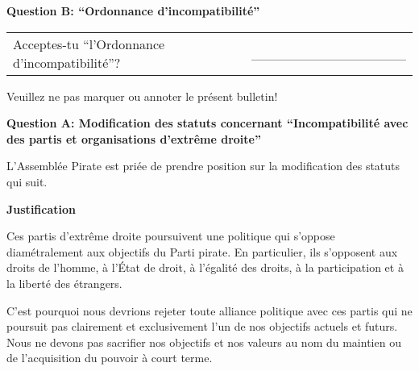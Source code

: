 \documentclass[11pt, a4paper]{scrartcl}
\begin{document}
{\begin{minipage}[t][12.5cm][t]{17.7cm}
\vspace{0.5cm}

\textbf{Question B: \enquote{Ordonnance d'incompatibilité}}

\vspace{0.5cm}

\begin{tabular}{ b{13.5cm} b{3cm} }
Acceptes-tu \enquote{l'Ordonnance d'incompatibilité}?
& \_\_\_\_\_\_\_\_\_\_\_\_\_\_\_\_ \\
\end{tabular}

\vspace{1.5cm}

Veuillez ne pas marquer ou annoter le présent bulletin!


\end{minipage}

\newpage

\setlength{\parindent}{0cm}
\setlength{\parskip}{0.2cm}




{\Large\textbf{Question A: Modification des statuts concernant \enquote{Incompatibilité avec des partis et organisations d'extrême droite}}}

L'Assemblée Pirate est priée de prendre position sur la modification des statuts qui suit.


\vspace{0.2cm}

\textbf{Justification}

Ces partis d'extrême droite poursuivent une politique qui s'oppose diamétralement aux objectifs du Parti pirate. En particulier, ils s'opposent aux droits de l'homme, à l'État de droit, à l'égalité des droits, à la participation et à la liberté des étrangers.

C'est pourquoi nous devrions rejeter toute alliance politique avec ces partis qui ne poursuit pas clairement et exclusivement l'un de nos objectifs actuels et futurs. Nous ne devons pas sacrifier nos objectifs et nos valeurs au nom du maintien ou de l'acquisition du pouvoir à court terme.

\vspace{0.2cm}

}
\end{document}
